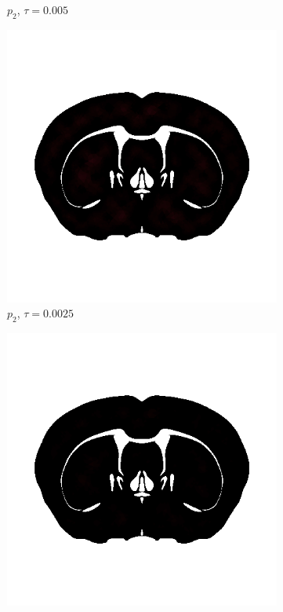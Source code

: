 \begin{figure}[h!]
\begin{subfigure}[b]{0.24\textwidth}
    \caption{$p_2$, $\tau=0.005$}
  \end{subfigure}
  \begin{subfigure}[b]{0.2\textwidth}
    \includegraphics[width=\textwidth,height=\textheight,keepaspectratio,height=\textheight,keepaspectratio]{figures/4_mpet/biomedical/time/eta4_p2_dt3.png}
    \caption{$p_2$, $\tau=0.0025$}
  \end{subfigure}
  \begin{subfigure}[b]{0.24\textwidth}
    \includegraphics[width=\textwidth,height=\textheight,keepaspectratio,height=\textheight,keepaspectratio]{figures/4_mpet/biomedical/time/eta4_p2_dt4.png}

\end{subfigure}
\end{figure}
